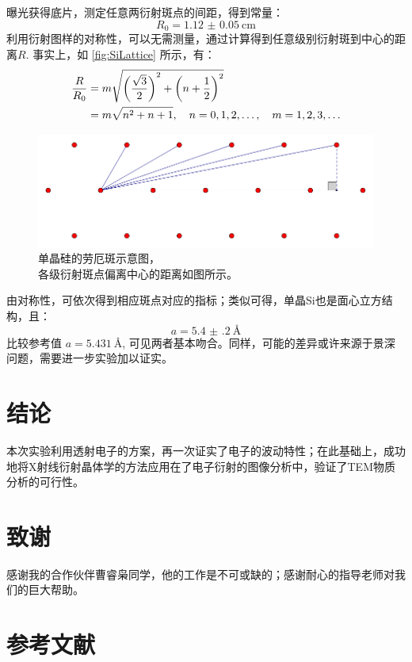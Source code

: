 \documentclass[aps,pre,12pt,preprint,%
	onecolumn,showpacs,showkeys,nofootinbib]{revtex4-2}
\begin{document}
	曝光获得底片，测定任意两衍射斑点的间距，得到常量：
	\begin{equation}
		R_0 = \SI{1.12(5)}{\cm}
	\end{equation}
	利用衍射图样的对称性，可以无需测量，通过计算得到任意级别衍射斑到中心的距离$R$. 事实上，如 \autoref{fig:SiLattice} 所示，有：
	\begin{equation}
	\begin{aligned}
		\frac{R}{R_0}
		&= m \sqrt{\pqty{\frac{\sqrt{3}}{2}}^2
			+ \pqty{n + \frac{1}{2}}^2} \\
		&= m \sqrt{n^2 + n + 1},\quad
		n = 0,1,2,\dots,\quad
		m = 1,2,3,\dots
	\end{aligned}
	\end{equation}
	\begin{figure}[!ht]
	\centering
	\includegraphics[width=.6\linewidth]{SiLattice.png}
	\caption{单晶硅的劳厄斑示意图，\\
		各级衍射斑点偏离中心的距离如图所示。}
	\label{fig:SiLattice}
	\end{figure}
\FloatBarrier
	
	由对称性，可依次得到相应斑点对应的指标；类似可得，单晶Si也是面心立方结构，且：
	\begin{equation}
		a = \SI{5.4(2)}{\angstrom}
	\end{equation}
	比较参考值\supercite{CODATAVa61:online} $a = \SI{5.431}{\angstrom}$, 可见两者基本吻合。同样，可能的差异或许来源于景深问题，需要进一步实验加以证实。
\section{结论}
	本次实验利用透射电子的方案，再一次证实了电子的波动特性；在此基础上，成功地将X射线衍射晶体学的方法应用在了电子衍射的图像分析中，验证了TEM物质分析的可行性。
\section{致谢}
	感谢我的合作伙伴曹睿枭同学，他的工作是不可或缺的；感谢耐心的指导老师对我们的巨大帮助。
\section{参考文献}


\clearpage
\end{document}

